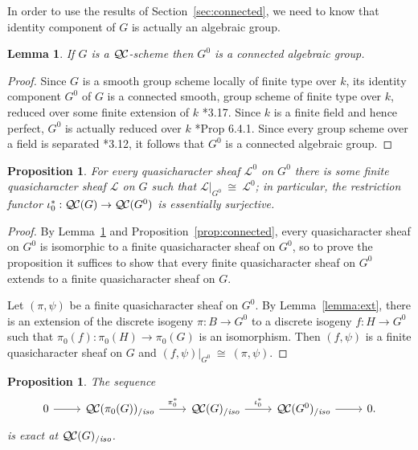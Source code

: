 \documentclass[11pt]{amsart}
\theoremstyle{plain}
\newtheorem{proposition}[theorem]{Proposition}
\newtheorem{lemma}[theorem]{Lemma}
\theoremstyle{definition}
\theoremstyle{remark}
\newcommand{\Fq}{k}
\newcommand{\iso}{{\ \cong\ }}
\newcommand{\qcs}[1]{{\mathcal{#1}}}
\newcommand{\QC}{{\mathcal{Q\hskip-0.8pt C}}}
\newcommand{\QCiso}[1]{\QC(#1)_{/\textit{iso}}}
\begin{document}
In order to use the results of Section~\ref{sec:connected}, we need to know that
identity component of $G$ is actually an algebraic group.

\begin{lemma} \label{lem:G0alg-grp}
If $G$ is a $\QC$-scheme then $G^0$ is a connected algebraic group.
\end{lemma}
\begin{proof}
 Since $G$ is a smooth group scheme locally of finite type over $\Fq$, its
 identity component $G^0$ of $G$ is a connected smooth, 
 group scheme of finite type over $\Fq$, reduced over some finite extension of $\Fq$
 \cite{vdGeer-Moonen:AbelianVarieties}*{3.17}. 
 Since $\Fq$ is a finite field and hence perfect, $G^0$ is actually reduced over $\Fq$
 \cite{EGAIV2}*{Prop 6.4.1}.  Since every group scheme over a field is separated 
 \cite{vdGeer-Moonen:AbelianVarieties}*{3.12},
 it follows that $G^0$ is a connected algebraic group.
\end{proof}

\begin{proposition}\label{prop:restriction}
For every quasicharacter sheaf $\qcs{L}^0$ on $G^0$ there is some finite quasicharacter sheaf $\qcs{L}$ on $G$ such that $\qcs{L}\vert_{G^0} \iso \qcs{L}^0$;
in particular, the restriction functor $\iota_0^* : \QC(G)\to \QC(G^0)$ is essentially surjective.
\end{proposition}

\begin{proof}
  By Lemma~\ref{lem:G0alg-grp} and Proposition~\ref{prop:connected}, every
  quasicharacter sheaf on $G^0$ is isomorphic to a 
  finite quasicharacter sheaf on $G^0$, 
  so to prove the proposition it suffices to show that every 
  finite quasicharacter sheaf on $G^0$ extends to a finite quasicharacter sheaf on $G$.
  
 Let $(\pi,\psi)$ be a finite quasicharacter sheaf on $G^0$.
 By Lemma~\ref{lemma:ext}, there is an extension of the 
 discrete isogeny $\pi : B \to G^0$ to a discrete isogeny $f : H \to G^0$ 
 such that $\pi_0(f) : \pi_0(H)\to \pi_0(G)$ is an isomorphism.
 Then $(f,\psi)$ is a finite quasicharacter sheaf on $G$ and 
 $(f,\psi)\vert_{G^0} \iso (\pi,\psi)$.
\end{proof}

\begin{proposition}\label{prop:middleexact}
 The sequence 
 \[
  \begin{tikzcd}
  0 \rar & \QCiso{\pi_0(G)} \arrow{r}{\pi_0^*} & \QCiso{G} \arrow{r}{\iota_0^*} & \QCiso{G^0} \rar & 0.
  \end{tikzcd}
 \]
 is exact at $\QCiso{G}$.
\end{proposition}
\end{document}
